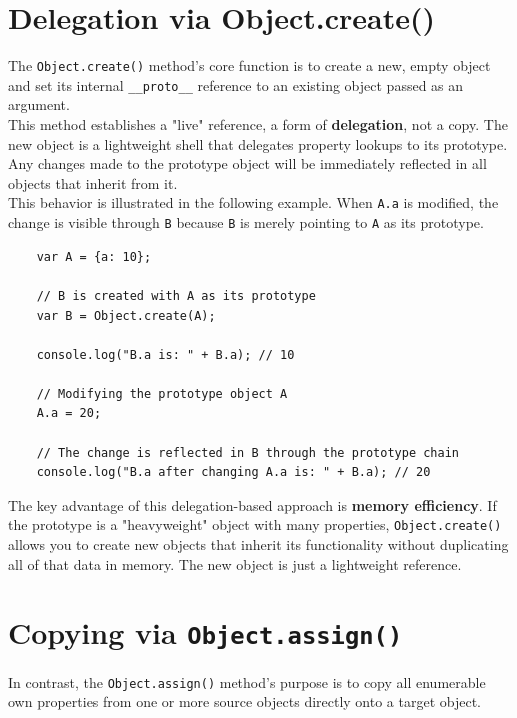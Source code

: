 \documentclass{scrbook}
\begin{document}
\section{Delegation via Object.create()}

The \texttt{Object.create()} method's core function is to create a new, empty object and set its internal \texttt{\_\_proto\_\_} reference to an existing object passed as an argument. \\

This method establishes a "live" reference, a form of \textbf{delegation}, not a copy. The new object is a lightweight shell that delegates property lookups to its prototype. Any changes made to the prototype object will be immediately reflected in all objects that inherit from it. \\

This behavior is illustrated in the following example. When \texttt{A.a} is modified, the change is visible through \texttt{B} because \texttt{B} is merely pointing to \texttt{A} as its prototype.

\begin{lstlisting}
    var A = {a: 10};
    
    // B is created with A as its prototype
    var B = Object.create(A);
    
    console.log("B.a is: " + B.a); // 10
    
    // Modifying the prototype object A
    A.a = 20;
    
    // The change is reflected in B through the prototype chain
    console.log("B.a after changing A.a is: " + B.a); // 20
\end{lstlisting}

The key advantage of this delegation-based approach is \textbf{memory efficiency}. If the prototype is a "heavyweight" object with many properties, \texttt{Object.create()} allows you to create new objects that inherit its functionality without duplicating all of that data in memory. The new object is just a lightweight reference.

\section{Copying via \texttt{Object.assign()}}

In contrast, the \texttt{Object.assign()} method's purpose is to copy all enumerable own properties from one or more source objects directly onto a target object. \\
\end{document}
